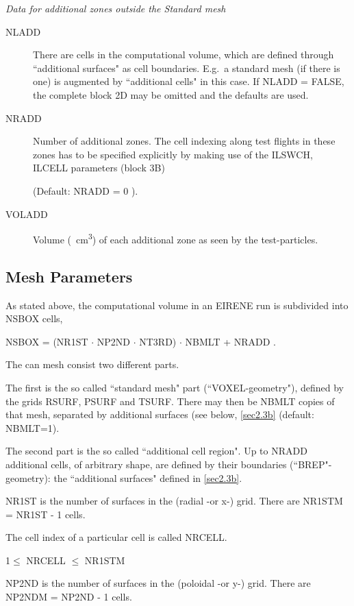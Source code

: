 \textsl{Data for additional zones outside the Standard mesh}
\begin{description}
  \item[NLADD] There are cells in the computational volume, which are defined
        through ``additional surfaces" as cell boundaries.
        E.g.\ a standard mesh (if there is one) is augmented by ``additional cells" in
        this case.
        If NLADD = FALSE, the complete block 2D may be omitted and the defaults are
        used.
  \item[NRADD] Number of additional zones.
        The  cell indexing along test flights in these zones has to be specified
        explicitly by making use of the ILSWCH, ILCELL parameters (block 3B)

        (Default: NRADD = 0 ).
  \item[VOLADD] Volume (\si{\per\cubic\centi\metre}) of each additional zone as
        seen by the test-particles.
\end{description}

\subsection{Mesh Parameters} \label{sec2.2.1}

As stated above, the computational volume in an EIRENE run is subdivided into
NSBOX cells, 

NSBOX = (NR1ST $\cdot$ NP2ND $\cdot$ NT3RD) $\cdot$ NBMLT + NRADD .

The can mesh consist two different parts.

The first is the so called ``standard mesh" part (``VOXEL-geometry"), defined
by the grids RSURF, PSURF and TSURF.
There may then be NBMLT copies of that mesh, separated by additional surfaces
(see below, \cref{sec2.3b} (default: NBMLT=1).

The second part is the so called ``additional cell region".
Up to NRADD additional cells, of arbitrary shape, are defined by their
boundaries (``\acs{BREP}"-geometry): the ``additional surfaces" defined in
\cref{sec2.3b}.

\medskip

NR1ST is the number of surfaces in the  (radial -or x-) grid.
There are NR1STM = NR1ST - 1 cells.

The cell index of a particular cell is called NRCELL.

1$\le$ NRCELL $\le$ NR1STM

NP2ND is the number of surfaces in the  (poloidal -or y-) grid.
There are NP2NDM = NP2ND - 1 cells.

